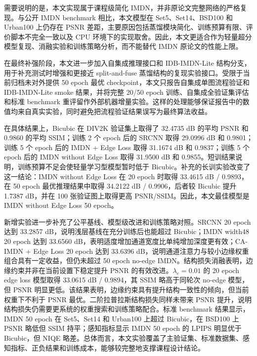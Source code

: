\documentclass[bwprint]{report}
\begin{document}
需要说明的是，本文实现属于课程级简化 IMDN，并非原论文完整网络的严格复现。与公开 IMDN benchmark 相比，本文模型在 Set5、Set14、BSD100 和 Urban100 上仍存在 PSNR 差距，主要原因包括蒸馏模块简化、训练预算有限、评价脚本不完全一致以及 CPU 环境下的实现取舍。因此，本文更适合作为轻量超分模型复现、消融实验和训练策略分析，而不能替代 IMDN 原论文的性能上限。

在最终补强阶段，本文进一步加入自集成推理接口和 IDB-IMDN-Lite 结构分支，用于补充测试时增强和更接近 split-and-fuse 蒸馏结构的复现实验接口。受限于当前归档未对外提供 50 epoch 最优 checkpoint，本文只报告自集成单图流程验证和 IDB-IMDN-Lite smoke 结果，并将完整 20/50 epoch 训练、自集成全验证集评估和标准 benchmark 重评留作外部机器增量实验。这样的处理能够保证报告中的数值均来自真实实验，同时避免把流程验证结果误写为最终算法收益。

在具体结果上，Bicubic 在 DIV2K 验证集上取得了 32.4735 dB 的平均 PSNR 和 0.9860 的平均 SSIM；训练 2 个 epoch 后的 SRCNN 取得 29.0996 dB 和 0.9801；训练 5 个 epoch 后的 IMDN + Edge Loss 取得 31.1674 dB 和 0.9837；训练 5 个 epoch 后的 IMDN without Edge Loss 取得 31.9500 dB 和 0.9855。短训结果说明，训练预算不足会使轻量学习型模型暂时低于 Bicubic。补充的长训实验改变了这一结论：IMDN without Edge Loss 在 20 epoch 时取得 33.4615 dB / 0.9893，在 50 epoch 最优推理结果中取得 34.2122 dB / 0.9906，后者较 Bicubic 提升 1.7387 dB，并在 100 张验证图上取得更高 PSNR/SSIM。因此，本文最佳模型是 IMDN without Edge Loss 50 epoch。

新增实验进一步补充了公平基线、模型级改进和训练策略对照。SRCNN 20 epoch 达到 33.2857 dB，说明浅层基线在充分训练后也能超过 Bicubic；IMDN width48 20 epoch 达到 33.6560 dB，表明适度增加通道宽度比单纯增加深度更有效；CA-IMDN + Edge Loss 20 epoch 达到 33.6396 dB，说明通道注意力与较小边缘权重组合具有一定收益，但仍未超过 50 epoch no-edge IMDN。结构损失消融表明，边缘约束并非在当前设置下稳定提升 PSNR 的有效改进。$\lambda_e=0.01$ 的 20 epoch edge loss 模型取得 33.0615 dB / 0.9894，其 SSIM 略高于同轮次 no-edge 模型，但 PSNR 明显更低。该结果表明，边缘约束具有提升结构一致性的倾向，但当前权重下不利于 PSNR 最优。二阶拉普拉斯结构损失同样未带来 PSNR 提升，说明结构损失仍需要更系统的权重搜索和训练策略配合。标准 benchmark 结果显示，IMDN 50 epoch 在 Set5、Set14 和 Urban100 上超过 Bicubic，在 BSD100 上 PSNR 略低但 SSIM 持平；感知指标显示 IMDN 50 epoch 的 LPIPS 明显优于 Bicubic，但 NIQE 略差。总体而言，本文实验覆盖了主验证集、标准数据集、感知指标、正负结果和训练成本，能够较完整地支撑课程设计结论。



\end{document}
